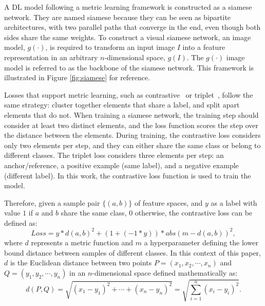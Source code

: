 A \gls{DL} model following a metric learning framework is constructed as a siamese network. They are named siamese because they can be seen as bipartite architectures, with two parallel paths that converge in the end, even though both sides share the same weights. To construct a visual siamese network, an image model, \( g(\cdot) \), is required to transform an input image \( I \) into a feature representation in an arbitrary $n$-dimensional space, \( g(I) \). The  \( g(\cdot) \) image model is referred to as the backbone of the siamese network. This framework is illustrated in Figure \ref{fig:siamese} for reference.

Losses that support metric learning, such as contrastive~\cite{chopra_learning_2005} or triplet~\cite{hoffer_deep_2018}, follow the same strategy: cluster together elements that share a label, and split apart elements that do not. When training a siamese network, the training step should consider at least two distinct elements, and the loss function scores the step over the distance between the elements. During training, the contrastive loss considers only two elements per step, and they can either share the same class or belong to different classes. The triplet loss considers three elements per step: an anchor/reference, a positive example (same label), and a negative example (different label). In this work, the contrastive loss function is used to train the model.

Therefore, given a sample pair $\{(a, b)\}$ of feature spaces, and $y$ as a label with value $1$ if $a$ and $b$ share the same class, $0$ otherwise, the contrastive loss can be defined as:
\begin{equation}
        Loss = y * d(a, b)^2 + (1 + (-1 * y)) * abs(m - d(a, b))^2,
\end{equation}
where $d$ represents a metric function and $m$ a hyperparameter defining the lower bound distance between samples of different classes. In this context of this paper, $d$ is the Euclidean distance between two points $P = (x_1, x_2, \cdots, x_n)$ and $Q = (y_1, y_2, \cdots, y_n)$ in an $n$-dimensional space defined mathematically as:
\begin{equation}
d(P,Q)={\sqrt {(x_{1}-y_{1})^{2}+ \cdots +(x_{n}-y_{n})^{2}}} = \sqrt{ \sum_{i=1}^{n} (x_i - y_i)^2 }.
\end{equation}

